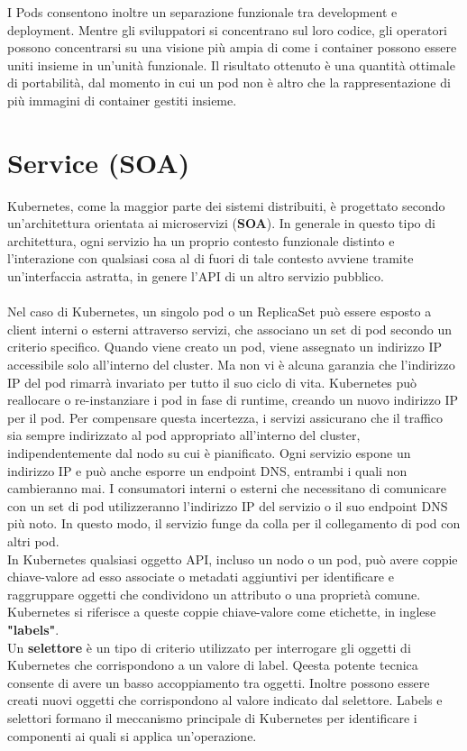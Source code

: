 \documentclass[12pt, a4paper]{report}
\begin{document}
I Pods consentono inoltre un separazione funzionale tra development e deployment. Mentre gli sviluppatori si concentrano sul loro codice, gli operatori possono concentrarsi su una visione più ampia di come i container possono essere uniti insieme in un'unità funzionale. Il risultato ottenuto è una quantità ottimale di portabilità, dal momento in cui un pod non è altro che la rappresentazione di più immagini di container gestiti insieme.
\section{Service (SOA)}
Kubernetes, come la maggior parte dei sistemi distribuiti, è progettato secondo un'architettura orientata ai microservizi (\textbf{SOA}). In generale in questo tipo di architettura, ogni servizio ha un proprio contesto funzionale distinto e l'interazione con qualsiasi cosa al di fuori di tale contesto avviene tramite un'interfaccia astratta, in genere l'API di un altro servizio pubblico.\\
\\
Nel caso di Kubernetes, un singolo pod o un ReplicaSet può essere esposto a client interni o esterni attraverso servizi, che associano un set di pod secondo un criterio specifico. Quando viene creato un pod, viene assegnato un indirizzo IP accessibile solo all'interno del cluster. Ma non vi è alcuna garanzia che l'indirizzo IP del pod rimarrà invariato per tutto il suo ciclo di vita. Kubernetes può reallocare o re-instanziare i pod in fase di runtime, creando un nuovo indirizzo IP per il pod. Per compensare questa incertezza, i servizi assicurano che il traffico sia sempre indirizzato al pod appropriato all'interno del cluster, indipendentemente dal nodo su cui è pianificato.  Ogni servizio espone un indirizzo IP e può anche esporre un endpoint DNS, entrambi i quali non cambieranno mai. I consumatori interni o esterni che necessitano di comunicare con un set di pod utilizzeranno l'indirizzo IP del servizio o il suo endpoint DNS più noto. In questo modo, il servizio funge da colla per il collegamento di pod con altri pod.
\\
In Kubernetes qualsiasi oggetto API, incluso un nodo o un pod, può avere coppie chiave-valore ad esso associate o metadati aggiuntivi per identificare e raggruppare oggetti che condividono un attributo o una proprietà comune. Kubernetes si riferisce a queste coppie chiave-valore come etichette, in inglese \textbf{"labels"}. \\
Un \textbf{selettore} è un tipo di criterio utilizzato per interrogare gli oggetti di Kubernetes che corrispondono a un valore di label. Qeesta potente tecnica consente di avere un basso accoppiamento tra oggetti. Inoltre possono essere creati nuovi oggetti che corrispondono al valore indicato dal selettore. Labels e selettori formano il meccanismo principale di Kubernetes per identificare i componenti ai quali si applica un'operazione.\\
\end{document}
